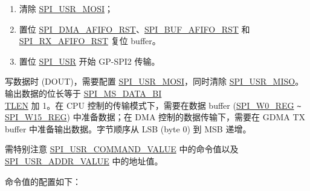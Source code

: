 \documentclass[main\_\_CN.tex]{subfiles}
\begin{document}
\begin{enumerate}
    \item 清除 \hyperref[fielddesc:SPIUSRMOSI]{SPI\_USR\_MOSI}；
    \item 置位 \hyperref[fielddesc:SPIDMAAFIFORST]{SPI\_DMA\_AFIFO\_RST}、\hyperref[fielddesc:SPIBUFAFIFORST]{SPI\_BUF\_AFIFO\_RST} 和 \hyperref[fielddesc:SPIRXAFIFORST]{SPI\_RX\_AFIFO\_RST} 复位 buffer。

    \item 置位 \hyperref[fielddesc:SPIUSR]{SPI\_USR} 开始 GP-SPI2 传输。
\end{enumerate}

写数据时 (DOUT)，需要配置 \hyperref[fielddesc:SPIUSRMOSI]{SPI\_USR\_MOSI}，同时清除 \hyperref[fielddesc:SPIUSRMISO]{SPI\_USR\_MISO}。输出数据的位长等于 \hyperref[fielddesc:SPIMSDATABITLEN]{SPI\_MS\_DATA\_BI\\TLEN} 加 1。在 CPU 控制的传输模式下，需要在数据 buffer (\hyperref[regdesc:SPIW0REG]{SPI\_W0\_REG} \verb+~+ \hyperref[regdesc:SPIW15REG]{SPI\_W15\_REG}) 中准备数据；在 DMA 控制的数据传输下，需要在 GDMA TX buffer 中准备输出数据。字节顺序从 LSB (byte 0) 到 MSB 递增。

需特别注意 \hyperref[fielddesc:SPIUSRCOMMANDVALUE]{SPI\_USR\_COMMAND\_VALUE} 中的命令值以及 \hyperref[fielddesc:SPIUSRADDRVALUE]{SPI\_USR\_ADDR\_VALUE} 中的地址值。

命令值的配置如下：
\end{document}
